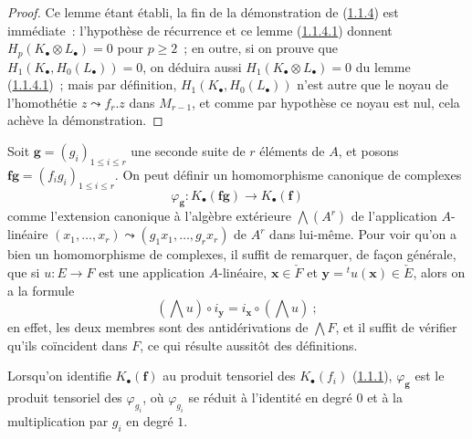 \begin{proof}
Ce lemme étant établi, la fin de la démonstration de
(\hyperref[III.1.1.4-fr]{1.1.4}) est immédiate~: l'hypothèse de récurrence et
ce lemme (\hyperref[III.1.1.4.1-fr]{1.1.4.1}) donnent
$H_p(K_\bullet\otimes L_\bullet)=0$ pour $p\geq2$~; en outre, si on prouve que
$H_1(K_\bullet,H_0(L_\bullet))=0$, on déduira aussi
$H_1(K_\bullet\otimes L_\bullet)=0$ du lemme
(\hyperref[III.1.1.4.1-fr]{1.1.4.1})~; mais par définition,
$H_1(K_\bullet,H_0(L_\bullet))$ n'est autre que le noyau de l'homothétie
$z\leadsto f_r.z$ dans $M_{r-1}$, et comme par hypothèse ce noyau est nul, cela
achève la démonstration.
\end{proof}

\begin{env}[1.1.5]
\label{III.1.1.5-fr}
Soit $\mathbf g=(g_i)_{1\leq i\leq r}$ une seconde suite de $r$ éléments de
$A$, et posons $\mathbf f\mathbf g=(f_ig_i)_{1\leq i\leq r}$. On peut définir
un homomorphisme canonique de complexes
\begin{equation}
\label{III.1.1.5.1-fr}
\tag{1.1.5.1}
\varphi_{\mathbf g}:K_\bullet(\mathbf f\mathbf g)\longrightarrow
K_\bullet(\mathbf f)
\end{equation}
comme l'extension canonique à l'algèbre extérieure $\bigwedge(A^r)$ de
l'application $A$-linéaire
$(x_1,\ldots,x_r)\leadsto(g_1x_1,\ldots,g_rx_r)$ de $A^r$ dans lui-même. Pour
voir qu'on a bien un homomorphisme de complexes, il suffit de remarquer, de
façon générale, que si $u:E\to F$ est une application $A$-linéaire,
$\mathbf x\in\check F$ et $\mathbf y={}^tu(\mathbf x)\in\check E$, alors on a
la formule
\begin{equation}
\label{III.1.1.5.2-fr}
\tag{1.1.5.2}
(\bigwedge u)\circ i_{\mathbf y}=i_{\mathbf x}\circ(\bigwedge u)~;
\end{equation}
en effet, les deux membres sont des antidérivations de $\bigwedge F$, et il
suffit de vérifier qu'ils coïncident dans $F$, ce qui résulte aussitôt des
définitions.

Lorsqu'on identifie $K_\bullet(\mathbf f)$ au produit tensoriel des
$K_\bullet(f_i)$ (\hyperref[III.1.1.1-fr]{1.1.1}), $\varphi_{\mathbf g}$ est
le produit tensoriel des $\varphi_{g_i}$, où $\varphi_{g_i}$ se réduit à
l'identité en degré $0$ et à la multiplication par $g_i$ en degré $1$.
\end{env}

